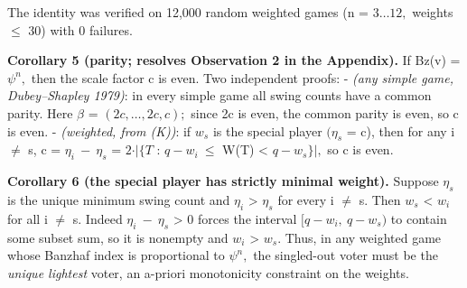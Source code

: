 \documentclass[
]{article}
\newcounter{none} %
\begin{document}
The identity was verified on 12,000 random weighted games (n =
\(3\dots12,\) weights \(\le\) 30) with 0 failures.

\textbf{Corollary 5 (parity; resolves Observation 2 in the Appendix).}
If Bz(v) = \(\psi^n,\) then the scale factor c is even. Two independent
proofs: - \emph{(any simple game, Dubey--Shapley 1979)}: in every simple
game all swing counts have a common parity. Here \(\beta\) =
\((2c,\dots,2c,c);\) since 2c is even, the common parity is even, so c
is even. - \emph{(weighted, from (K))}: if \(w_s\) is the special player
\((\eta_s\) = c), then for any i \(\ne\) s, c = \(\eta_i\ -\ \eta_s\) =
\(2\cdot\vert\{T\) : \(q-w_i\ \le\) W(T) \textless{} \(q-w_s\}\vert,\)
so c is even.

\textbf{Corollary 6 (the special player has strictly minimal weight).}
Suppose \(\eta_s\) is the unique minimum swing count and \(\eta_i\)
\textgreater{} \(\eta_s\) for every i \(\ne\) s. Then \(w_s\)
\textless{} \(w_i\) for all i \(\ne\) s. Indeed \(\eta_i\ -\ \eta_s\)
\textgreater{} 0 forces the interval \([q-w_i,\ q-w_s)\) to contain some
subset sum, so it is nonempty and \(w_i\) \textgreater{} \(w_s.\) Thus,
in any weighted game whose Banzhaf index is proportional to \(\psi^n,\)
the singled-out voter must be the \emph{unique lightest} voter, an
a-priori monotonicity constraint on the weights.
\end{document}
